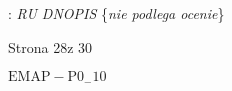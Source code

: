 \documentclass[a4paper,12pt]{article}
\begin{document}
: {\it RU DNOPIS} \{{\it nie podlega ocenie}\}

Strona 28z 30

$\mathrm{E}\mathrm{M}\mathrm{A}\mathrm{P}-\mathrm{P}0_{-}10$
\end{document}
